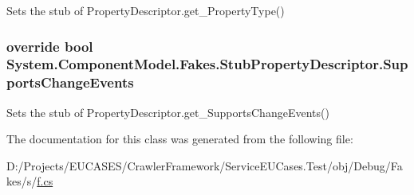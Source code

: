 Sets the stub of Property\-Descriptor.\-get\-\_\-\-Property\-Type()

\hypertarget{class_system_1_1_component_model_1_1_fakes_1_1_stub_property_descriptor_aae9db6f07c859fa57817860f861e6cf8}{
\subsubsection[{Supports\-Change\-Events}]{\setlength{\rightskip}{0pt plus 5cm}override bool System.\-Component\-Model.\-Fakes.\-Stub\-Property\-Descriptor.\-Supports\-Change\-Events\hspace{0.3cm}{\ttfamily [get]}}}\label{class_system_1_1_component_model_1_1_fakes_1_1_stub_property_descriptor_aae9db6f07c859fa57817860f861e6cf8}


Sets the stub of Property\-Descriptor.\-get\-\_\-\-Supports\-Change\-Events()



The documentation for this class was generated from the following file\-:\begin{DoxyCompactItemize}
\item 
D\-:/\-Projects/\-E\-U\-C\-A\-S\-E\-S/\-Crawler\-Framework/\-Service\-E\-U\-Cases.\-Test/obj/\-Debug/\-Fakes/s/\hyperlink{s_2f_8cs}{f.\-cs}\end{DoxyCompactItemize}
